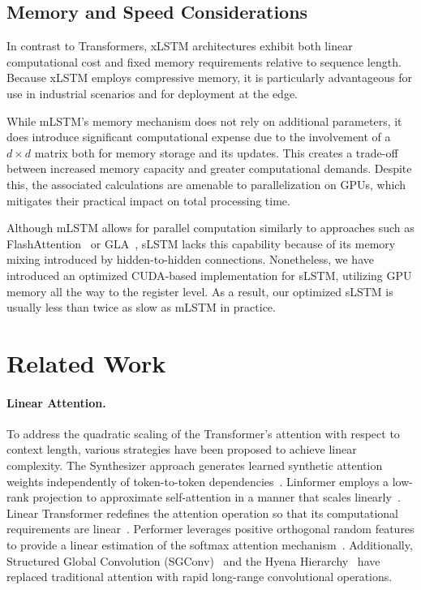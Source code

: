 \subsection{Memory and Speed Considerations}

In contrast to Transformers, xLSTM architectures exhibit both linear computational cost and fixed memory requirements relative to sequence length. Because xLSTM employs compressive memory, it is particularly advantageous for use in industrial scenarios and for deployment at the edge.

While mLSTM’s memory mechanism does not rely on additional parameters, it does introduce significant computational expense due to the involvement of a $d \times d$ matrix both for memory storage and its updates. This creates a trade-off between increased memory capacity and greater computational demands. Despite this, the associated calculations are amenable to parallelization on GPUs, which mitigates their practical impact on total processing time.

Although mLSTM allows for parallel computation similarly to approaches such as FlashAttention~\citep{Dao:22,Dao:23} or GLA~\citep{Yang:23arxiv}, sLSTM lacks this capability because of its memory mixing introduced by hidden-to-hidden connections. Nonetheless, we have introduced an optimized CUDA-based implementation for sLSTM, utilizing GPU memory all the way to the register level. As a result, our optimized sLSTM is usually less than twice as slow as mLSTM in practice.

\section{Related Work}
\label{sec:related}

\paragraph{Linear Attention.} To address the quadratic scaling of the Transformer's attention with respect to context length, various strategies have been proposed to achieve linear complexity. The Synthesizer approach generates learned synthetic attention weights independently of token-to-token dependencies~\citep{Tay:20arxiv}. Linformer employs a low-rank projection to approximate self-attention in a manner that scales linearly~\citep{Wang:20arxiv}. Linear Transformer redefines the attention operation so that its computational requirements are linear~\citep{Katharopoulos:20}. Performer leverages positive orthogonal random features to provide a linear estimation of the softmax attention mechanism~\citep{Choromanski:21}. Additionally, Structured Global Convolution (SGConv)~\citep{Li:22} and the Hyena Hierarchy~\citep{Poli:23} have replaced traditional attention with rapid long-range convolutional operations.

